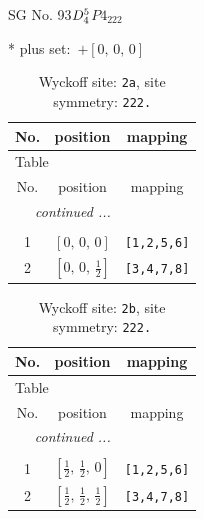 \documentclass[fleqn,8pt]{jsarticle}
\begin{document}
\setcounter{MaxMatrixCols}{32}

\renewcommand{\tablename}{Table~}
\renewcommand{\figurename}{Figure~}
\begin{center}
\LARGE
SG No. 93\quad$D_{\rm 4}^{5}$\quad$P4_222$\quad[ tetragonal ]
\end{center}
* plus set:\,\,\,$+\left[ 0,\, 0,\, 0 \right]$
\renewcommand{\arraystretch}{1.2}
\begin{longtable}{ccc}
\caption{Wyckoff site: {\tt 2a}, site symmetry: {\tt 222.}}
 \\
 \hline \hline
No. & position & mapping \\ \hline \endfirsthead

\multicolumn{2}{l}{\tablename\ \thetable{}} \\
 \hline \hline
No. & position & mapping \\ \hline \endhead

 \hline \hline
\multicolumn{2}{r}{\footnotesize\it continued ...} \\ \endfoot

 \hline \hline
\multicolumn{2}{r}{} \\ \endlastfoot

1 & $\left[ 0,\, 0,\, 0 \right]$ & {\tt [1,2,5,6]} \\ \hline
2 & $\left[ 0,\, 0,\, \frac{1}{2} \right]$ & {\tt [3,4,7,8]} \\
\end{longtable}
\renewcommand{\arraystretch}{1.2}
\begin{longtable}{ccc}
\caption{Wyckoff site: {\tt 2b}, site symmetry: {\tt 222.}}
 \\
 \hline \hline
No. & position & mapping \\ \hline \endfirsthead

\multicolumn{2}{l}{\tablename\ \thetable{}} \\
 \hline \hline
No. & position & mapping \\ \hline \endhead

 \hline \hline
\multicolumn{2}{r}{\footnotesize\it continued ...} \\ \endfoot

 \hline \hline
\multicolumn{2}{r}{} \\ \endlastfoot

1 & $\left[ \frac{1}{2},\, \frac{1}{2},\, 0 \right]$ & {\tt [1,2,5,6]} \\ \hline
2 & $\left[ \frac{1}{2},\, \frac{1}{2},\, \frac{1}{2} \right]$ & {\tt [3,4,7,8]} \\
\end{longtable}
\end{document}
